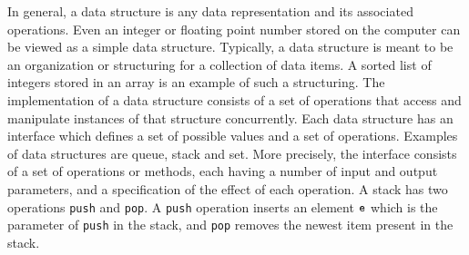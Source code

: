 In general, a data structure is any data representation and its
associated operations. Even an integer or floating point number stored on the computer can be viewed as a simple data structure. Typically, a data structure is meant to be an organization or structuring for a collection of data items. A sorted list of integers stored in an array is an example of such a structuring. The implementation of a data structure consists of a set of operations that access and manipulate instances of that structure concurrently. Each data structure has an interface which defines a set of possible values and a set of operations. Examples of data structures are queue, stack and set. More precisely, the interface consists of a set of operations or methods, each having a number of input and output parameters, and a specification of the effect of each operation. 
A stack has two operations {\tt push} and {\tt pop}. A {\tt push} operation inserts an element $\tt e$ which is the parameter of {\tt push} in the stack, and {\tt pop} removes the newest item present in the stack. 


